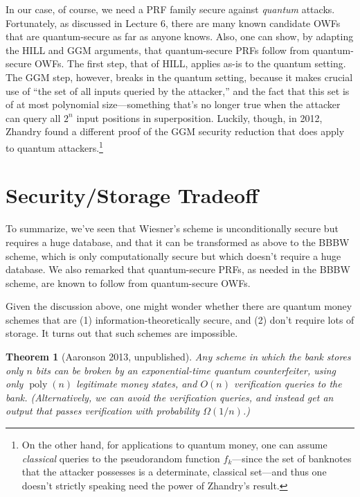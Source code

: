 \documentclass[11pt]{report}
\theoremstyle{plain}
\newtheorem{theorem}{Theorem}[section]
\theoremstyle{definition}
\newcommand{\poly}{\operatorname{poly}}
\begin{document}
In our case, of course, we need a PRF family secure against \emph{quantum} attacks.  Fortunately, as discussed in Lecture 6, there are many known candidate OWFs that are quantum-secure as far as anyone knows.  Also, one can show, by adapting the HILL and GGM arguments, that quantum-secure PRFs follow from quantum-secure OWFs.  The first step, that of HILL, applies as-is to the quantum setting.  The GGM step, however, breaks in the quantum setting, because it makes crucial use of ``the set of all inputs queried by the attacker,'' and the fact that this set is of at most polynomial size---something that's no longer true when the attacker can query all $2^n$ input positions in superposition.  Luckily, though, in 2012, Zhandry \cite{Zha12} found a different proof of the GGM security reduction that does apply to quantum attackers.\footnote{On the other hand, for applications to quantum money, one can assume {\em classical} queries to the pseudorandom function $f_k$---since the set of banknotes that the attacker possesses is a determinate, classical set---and thus one doesn't strictly speaking need the power of Zhandry's result.}

\section{Security/Storage Tradeoff}

To summarize, we've seen that Wiesner's scheme is unconditionally secure but requires a huge database, and that it can be transformed as above to the BBBW scheme, which is only computationally secure but which doesn't require a huge database.  We also remarked that quantum-secure PRFs, as needed in the BBBW scheme, are known to follow from quantum-secure OWFs.

Given the discussion above, one might wonder whether there are quantum money schemes that
are (1) information-theoretically secure, and (2) don't require lots of storage.  It turns out that such schemes are impossible.

\begin{theorem}[Aaronson 2013, unpublished]
\label{thm:sront_counterfeiter}
Any scheme in which the bank stores only $n$ bits can be broken by an exponential-time
quantum counterfeiter, using only $\poly(n)$ legitimate money states, and $O(n)$ verification queries to the bank. (Alternatively, we can avoid the verification queries, and instead get an output that passes verification with probability $\Omega(1/n)$.)
\end{theorem}
\end{document}
